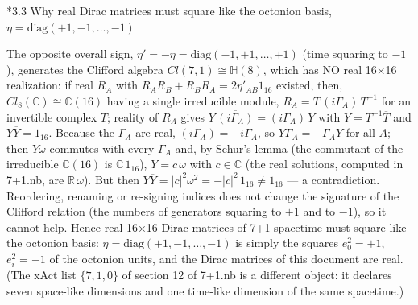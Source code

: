 \documentclass[10pt,a4paper]{article}
\makeatletter
\renewcommand\subsection{\@startsection{subsection}{2}{\z@}{-3.25ex\@plus -1ex \@minus -.2ex}{1.5ex \@plus .2ex}{\normalfont\large\bfseries\raggedright}}
\makeatother
\begin{document}
\subsection*{3.3 Why real Dirac matrices must square like the octonion basis, \texorpdfstring{$\eta=\mathrm{diag}(+1,-1,\dots,-1)$}{η=diag(+1,-1,,-1)}}
The opposite overall sign, $\eta'=-\eta=\mathrm{diag}(-1,+1,\dots,+1)$ (time squaring to $-1$), generates the Clifford algebra $Cl(7,1)\cong\mathbb H(8)$, which has NO real 16×16 realization: if real $R_A$ with $R_AR_B+R_BR_A=2\eta'_{AB}1_{16}$ existed, then, $Cl_8(\mathbb C)\cong\mathbb C(16)$ having a single irreducible module, $R_A=T\,(i\Gamma_A)\,T^{-1}$ for an invertible complex $T$; reality of $R_A$ gives $Y\,\overline{(i\Gamma_A)}=(i\Gamma_A)\,Y$ with $Y=T^{-1}\overline T$ and $Y\overline Y=1_{16}$. Because the $\Gamma_A$ are real, $\overline{(i\Gamma_A)}=-i\Gamma_A$, so $Y\Gamma_A=-\Gamma_AY$ for all $A$; then $Y\omega$ commutes with every $\Gamma_A$ and, by Schur’s lemma (the commutant of the irreducible $\mathbb C(16)$ is $\mathbb C\,1_{16}$), $Y=c\,\omega$ with $c\in\mathbb C$ (the real solutions, computed in 7+1.nb, are $\mathbb R\,\omega$). But then $Y\overline Y=|c|^2\omega^2=-|c|^2\,1_{16}\neq1_{16}$ — a contradiction. Reordering, renaming or re-signing indices does not change the signature of the Clifford relation (the numbers of generators squaring to $+1$ and to $-1$), so it cannot help. Hence real 16×16 Dirac matrices of 7+1 spacetime must square like the octonion basis: $\eta=\mathrm{diag}(+1,-1,\dots,-1)$ is simply the squares $e_0^2=+1$, $e_i^2=-1$ of the octonion units, and the Dirac matrices of this document are real. (The xAct list $\{7,1,0\}$ of section 12 of 7+1.nb is a different object: it declares seven space-like dimensions and one time-like dimension of the same spacetime.)
\end{document}
